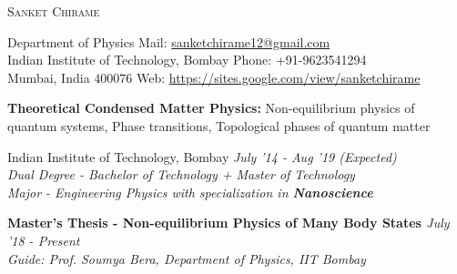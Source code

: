 \documentclass[10pt]{article}%
\newcommand{\xfilll}[2][1ex]{
\dimen0=#2\advance\dimen0 by #1
\leaders\hrule height \dimen0 depth -#1\hfill}
\begin{document}
\begin{center}
\huge{\textsc{Sanket Chirame}}\\
\vspace{1.5mm}
\end{center}
Department of Physics  \hfill Mail: \href{mailto:sanketchirame12@gmail.com}{sanketchirame12@gmail.com}\\
Indian Institute of Technology, Bombay \hfill Phone: +91-9623541294\\
Mumbai, India $400 076$ \hfill Web: \url{https://sites.google.com/view/sanketchirame}\\
\vspace{2mm}
{%
{}
\vspace{-2mm}
\textbf{Theoretical Condensed Matter Physics:} Non-equilibrium physics of quantum systems, Phase transitions, Topological phases of quantum matter
\vspace{-1mm}
Indian Institute of Technology, Bombay   \hfill \textit{July '14 - Aug '19 (Expected)}\\
{\em Dual Degree - Bachelor of Technology + Master of Technology \\ Major - Engineering Physics with specialization in \textbf{Nanoscience}} %



 \vspace{-3mm}

{\flushleft \bf \large{Master's Thesis - Non-equilibrium Physics of Many Body States }}  \hfill {{{\textit{July '18 - Present}}}} \\
{\em Guide: Prof. Soumya Bera, Department of Physics, IIT Bombay} 

}
\end{document}

